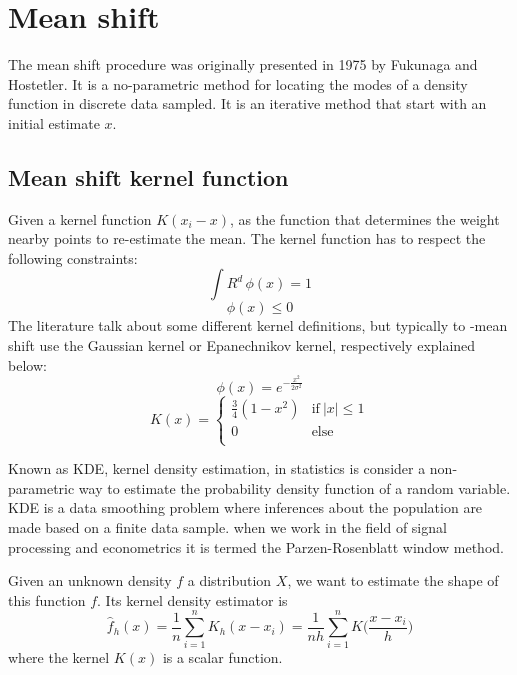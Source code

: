\chapter{Mean shift}
The mean shift procedure was originally presented in 1975 by Fukunaga and Hostetler. It is a no-parametric method for locating the modes of a density function in  discrete data sampled. It is an iterative method that start with an initial estimate $x$.
\section{Mean shift kernel function}
Given a kernel function $K(x_{i}-x)$, as the function that determines the weight nearby points to re-estimate the mean. The kernel function has to respect the following constraints:
\begin{equation}
\int R^{d} \,\phi({x})=1 
\end{equation}
\begin{equation}
\phi ({x}) \leq 0
\end{equation}
The literature talk about some different kernel definitions, but typically to -mean shift use the Gaussian kernel or Epanechnikov kernel, respectively explained below:
\begin{equation}
\phi({x}) = e^{-\frac{x^{2}}{2\sigma^{2}}}
\end{equation}
\begin{equation}
K(x)={\begin{cases}\frac{3}{4}(1-x^{2})&{\text{if}}\ |x|\leq 1 \\0&{\text{else}}\  \\\end{cases}}
\end{equation}

\bigskip

Known as KDE, kernel density estimation, in statistics is consider a non-parametric way to estimate the probability density function of a random variable. KDE is a data smoothing problem where inferences about the population are made based on a finite data sample. when we work in the field of signal processing and econometrics it is termed the Parzen-Rosenblatt window method. 

\bigskip

Given an unknown density $f$ a distribution $X$, we want to estimate the shape of this function $f$. Its kernel density estimator is 
\begin{equation}
{{\hat {f}}_{h}(x)={\frac {1}{n}}\sum _{i=1}^{n}K_{h}(x-x_{i})={\frac {1}{nh}}\sum _{i=1}^{n}K{\Big (}{\frac {x-x_{i}}{h}}{\Big )}}
\end{equation} 
where the kernel $K(x)$ is a scalar function.

